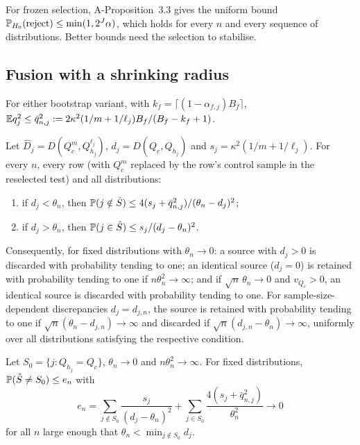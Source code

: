 \documentclass[11pt,a4paper]{article}
\begin{document}
For frozen selection, A-Proposition~3.3 gives the uniform bound $\P_{H_0}(\text{reject})\le\min(1,2^J\alpha)$, which holds for every $n$ and every sequence of distributions. Better bounds need the selection to stabilise.

\subsection{Fusion with a shrinking radius}\label{sec:fusion}

\begin{lemma}\label{lem:q}
For either bootstrap variant, with $k_f=\lceil(1-\alpha_{f,j})B_f\rceil$, $\E q_j^2\le\bar q^2_{n,j}:=2\kappa^2(1/m+1/\ell_j)B_f/(B_f-k_f+1)$.
\end{lemma}

\begin{theorem}\label{thm:fusion}
Let $\hat D_j=D(Q^m_c,Q^{\ell_j}_{h_j})$, $d_j=D(Q_c,Q_{h_j})$ and $s_j=\kappa^2(1/m+1/\ell_j)$. For every $n$, every row (with $Q^m_c$ replaced by the row's control sample in the reselected test) and all distributions:
\begin{enumerate}[label=(\alph*),itemsep=1pt]
\item if $d_j<\theta_n$, then $\P(j\notin\hat S)\le4(s_j+\bar q^2_{n,j})/(\theta_n-d_j)^2$;
\item if $d_j>\theta_n$, then $\P(j\in\hat S)\le s_j/(d_j-\theta_n)^2$.
\end{enumerate}
Consequently, for fixed distributions with $\theta_n\to0$: a source with $d_j>0$ is discarded with probability tending to one; an identical source ($d_j=0$) is retained with probability tending to one if $n\theta_n^2\to\infty$; and if $\sqrt n\,\theta_n\to0$ and $v_{Q_c}>0$, an identical source is discarded with probability tending to one. For sample-size-dependent discrepancies $d_j=d_{j,n}$, the source is retained with probability tending to one if $\sqrt n(\theta_n-d_{j,n})\to\infty$ and discarded if $\sqrt n(d_{j,n}-\theta_n)\to\infty$, uniformly over all distributions satisfying the respective condition.
\end{theorem}

\begin{corollary}\label{cor:oracle}
Let $S_0=\{j:Q_{h_j}=Q_c\}$, $\theta_n\to0$ and $n\theta_n^2\to\infty$. For fixed distributions, $\P(\hat S\neq S_0)\le e_n$ with
\[
e_n=\sum_{j\notin S_0}\frac{s_j}{(d_j-\theta_n)^2}+\sum_{j\in S_0}\frac{4(s_j+\bar q^2_{n,j})}{\theta_n^2}\to0
\]
for all $n$ large enough that $\theta_n<\min_{j\notin S_0}d_j$.
\end{corollary}
\end{document}
